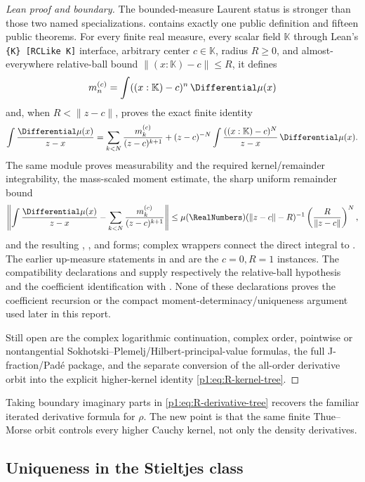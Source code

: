 \documentclass[11pt]{article}
\theoremstyle{definition}
\theoremstyle{remark}
\begin{document}
\begin{proof}[Lean proof and boundary]
The bounded-measure Laurent status is stronger than those two named
specializations.   contains exactly one
public definition and fifteen public theorems.  For every finite real measure,
every scalar field \(\mathbb K\) through Lean's
\texttt{\{K\} [RCLike K]} interface, arbitrary center \(c\in\mathbb K\),
radius \(R\ge0\), and almost-everywhere relative-ball bound
\(\lVert(x:\mathbb K)-c\rVert\le R\), it defines
\[
 m_n^{(c)}=\int ((x:\mathbb K)-c)^n\,\Differential\mu(x)
\]
and, when \(R<\lVert z-c\rVert\), proves the exact finite identity
\[
 \int\frac{\Differential\mu(x)}{z-x}
 =\sum_{k<N}\frac{m_k^{(c)}}{(z-c)^{k+1}}
  +(z-c)^{-N}\int\frac{((x:\mathbb K)-c)^N}{z-x}\,\Differential\mu(x).
\]
The same module proves measurability and the required kernel/remainder
integrability, the mass-scaled moment estimate, the sharp uniform remainder
bound
\[
 \left\lVert\int\frac{\Differential\mu(x)}{z-x}
 -\sum_{k<N}\frac{m_k^{(c)}}{(z-c)^{k+1}}\right\rVert
 \le \mu(\RealNumbers)(\lVert z-c\rVert-R)^{-1}
       \left(\frac{R}{\lVert z-c\rVert}\right)^N,
\]
and the resulting , , and  forms;
complex wrappers connect the direct integral to
.  The earlier up-measure statements in
 and
 are the \(c=0,R=1\) instances.
The compatibility declarations
 and
 supply respectively the
relative-ball hypothesis and the coefficient identification with
.  None of these declarations proves the coefficient recursion
or the compact moment-determinacy/uniqueness argument used later in this
report.

Still open are the complex logarithmic continuation, complex order, pointwise or
nontangential Sokhotski--Plemelj/Hilbert-principal-value formulas, the full
J-fraction/Pad\'e package, and the separate conversion of the all-order derivative orbit
into the explicit higher-kernel identity \eqref{p1:eq:R-kernel-tree}.
\end{proof}

Taking boundary imaginary parts in \eqref{p1:eq:R-derivative-tree} recovers the familiar
iterated derivative formula for \(\rho\).  The new point is that the same finite
Thue--Morse orbit controls every higher Cauchy kernel, not only the density derivatives.

\subsection{Uniqueness in the Stieltjes class}
\end{document}
